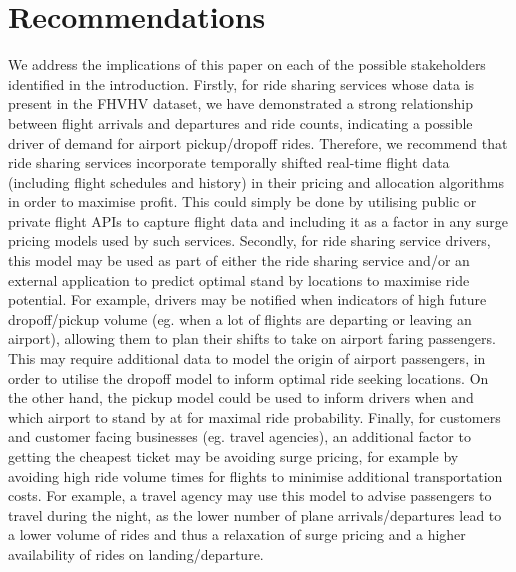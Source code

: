 \documentclass[11pt]{article}
\begin{document}
\section{Recommendations}
We address the implications of this paper on each of the possible stakeholders identified in the introduction. 
Firstly, for ride sharing services whose data is present in the FHVHV dataset, we have demonstrated a strong relationship between flight arrivals and departures and ride counts, indicating a possible driver of demand for airport pickup/dropoff rides. Therefore, we recommend that ride sharing services incorporate temporally shifted real-time flight data (including flight schedules and history) in their pricing and allocation algorithms in order to maximise profit. This could simply be done by utilising public or private flight APIs to capture flight data and including it as a factor in any surge pricing models used by such services.
Secondly, for ride sharing service drivers, this model may be used as part of either the ride sharing service and/or an external application to predict optimal stand by locations to maximise ride potential. For example, drivers may be notified when indicators of high future dropoff/pickup volume (eg. when a lot of flights are departing or leaving an airport), allowing them to plan their shifts to take on airport faring passengers. This may require additional data to model the origin of airport passengers, in order to utilise the dropoff model to inform optimal ride seeking locations. On the other hand, the pickup model could be used to inform drivers when and which airport to stand by at for maximal ride probability.
Finally, for customers and customer facing businesses (eg. travel agencies), an additional factor to getting the cheapest ticket may be avoiding surge pricing, for example by avoiding high ride volume times for flights to minimise additional transportation costs. For example, a travel agency may use this model to advise passengers to travel during the night, as the lower number of plane arrivals/departures lead to a lower volume of rides and thus a relaxation of surge pricing and a higher availability of rides on landing/departure.

\clearpage

\printbibliography
\end{document}
